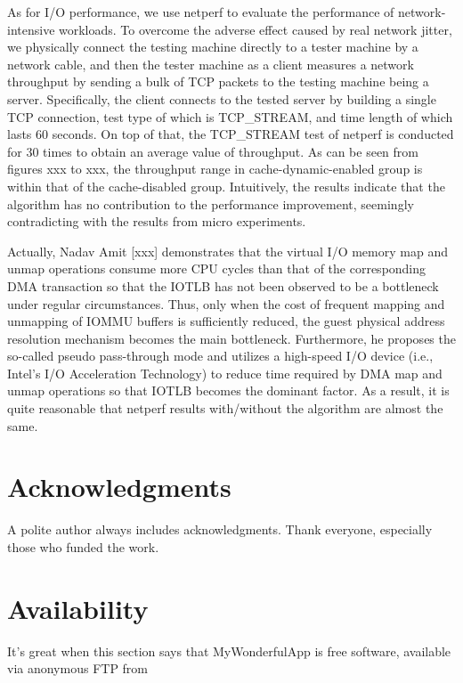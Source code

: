 \documentclass[letterpaper,twocolumn,10pt]{article}
\begin{document}
As for I/O performance, we use netperf to evaluate the performance of network-intensive workloads. To overcome the adverse effect caused by real network jitter, we physically connect the testing machine directly to a tester machine by a network cable, and then the tester machine as a client measures a network throughput by sending a bulk of TCP packets to the testing machine being a server. Specifically, the client connects to the tested server by building a single TCP connection, test type of which is TCP\_STREAM, and time length of which lasts $60$ seconds. On top of that, the TCP\_STREAM test of netperf is conducted for $30$ times to obtain an average value of throughput. As can be seen from figures xxx to xxx, the throughput range in cache-dynamic-enabled group is within that of the cache-disabled group. Intuitively, the results indicate that the algorithm has no contribution to the performance improvement, seemingly contradicting with the results from micro experiments.

Actually, Nadav Amit [xxx] demonstrates that the virtual I/O memory map and unmap operations consume more CPU cycles than  that of the corresponding DMA transaction so that the IOTLB has not been observed to be a bottleneck under regular circumstances. Thus, only when the cost of frequent mapping and unmapping of IOMMU buffers is sufficiently reduced, the guest physical address resolution mechanism becomes the main bottleneck. Furthermore, he proposes the so-called pseudo pass-through mode and utilizes a high-speed I/O device (i.e., Intel’s I/O Acceleration Technology) to reduce time required by DMA map and unmap operations so that IOTLB becomes the dominant factor. As a result, it is quite reasonable that netperf results with/without the algorithm are almost the same.



\section{Acknowledgments}

A polite author always includes acknowledgments.  Thank everyone,
especially those who funded the work.

\section{Availability}

It's great when this section says that MyWonderfulApp is free software,
available via anonymous FTP from
\end{document}
